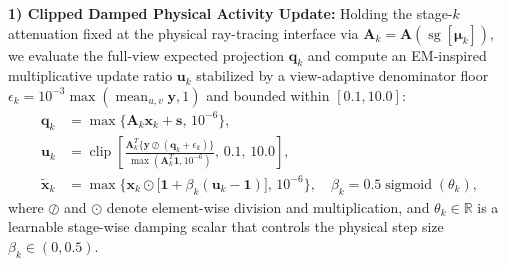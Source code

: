 \documentclass[11pt, a4paper]{article}
\begin{document}
\textbf{1) Clipped Damped Physical Activity Update:} Holding the stage-$k$ attenuation fixed at the physical ray-tracing interface via $\mathbf{A}_k = \mathbf{A}(\operatorname{sg}[\boldsymbol{\mu}_k])$, we evaluate the full-view expected projection $\mathbf{q}_k$ and compute an EM-inspired multiplicative update ratio $\mathbf{u}_k$ stabilized by a view-adaptive denominator floor $\epsilon_k = 10^{-3} \max(\operatorname{mean}_{u,v} \mathbf{y}, 1)$ and bounded within $[0.1, 10.0]$:
\begin{align}
\mathbf{q}_k &= \max\big\{\mathbf{A}_k \mathbf{x}_k + \mathbf{s}, \, 10^{-6}\big\}, \\
\mathbf{u}_k &= \operatorname{clip}\!\left[ \frac{\mathbf{A}_k^T \big\{ \mathbf{y} \oslash (\mathbf{q}_k + \epsilon_k) \big\}}{\max(\mathbf{A}_k^T \mathbf{1}, 10^{-6})}, \, 0.1, \, 10.0 \right], \\
\widetilde{\mathbf{x}}_k &= \max\Big\{ \mathbf{x}_k \odot \big[ \mathbf{1} + \beta_k (\mathbf{u}_k - \mathbf{1}) \big], \, 10^{-6} \Big\}, \quad \beta_k = 0.5 \operatorname{sigmoid}(\theta_k),
\end{align}
where $\oslash$ and $\odot$ denote element-wise division and multiplication, and $\theta_k \in \mathbb{R}$ is a learnable stage-wise damping scalar that controls the physical step size $\beta_k \in (0, 0.5)$.
\end{document}
